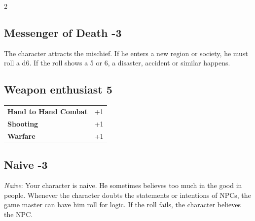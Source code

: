 \begin{multicols}{2}
\begin{tcolorbox}
\vspace{3mm}



\end{tcolorbox}

\begin{tcolorbox}
    \subsection*{Messenger of Death \hfill \small{-3 }}
    \tcblower
The character attracts the mischief. If he enters a new region or society, he must roll a d6. If the roll shows a 5 or 6, a disaster, accident or similar happens.


\vspace{3mm}



\end{tcolorbox}

\begin{tcolorbox}
    \subsection*{Weapon enthusiast \hfill \small{5 }}
    \tcblower




\begin{tabular}{@{}ll@{}}
    \textbf{Hand to Hand Combat} & +1\\
    \textbf{Shooting} & +1\\
    \textbf{Warfare} & +1\\
\end{tabular}


\end{tcolorbox}

\begin{tcolorbox}
    \subsection*{Naive \hfill \small{-3 }}
    \tcblower
\textit{Naive}: Your character is naive. He sometimes believes too much in the good in people. Whenever the character doubts the statements or intentions of NPCs, the game master can have him roll for logic. If the roll fails, the character believes the NPC.



\end{tcolorbox}
\end{multicols}
